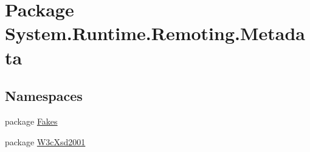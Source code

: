 \hypertarget{namespace_system_1_1_runtime_1_1_remoting_1_1_metadata}{\section{Package System.\-Runtime.\-Remoting.\-Metadata}
\label{namespace_system_1_1_runtime_1_1_remoting_1_1_metadata}
}
\subsection*{Namespaces}
\begin{DoxyCompactItemize}
\item 
package \hyperlink{namespace_system_1_1_runtime_1_1_remoting_1_1_metadata_1_1_fakes}{Fakes}
\item 
package \hyperlink{namespace_system_1_1_runtime_1_1_remoting_1_1_metadata_1_1_w3c_xsd2001}{W3c\-Xsd2001}
\end{DoxyCompactItemize}
